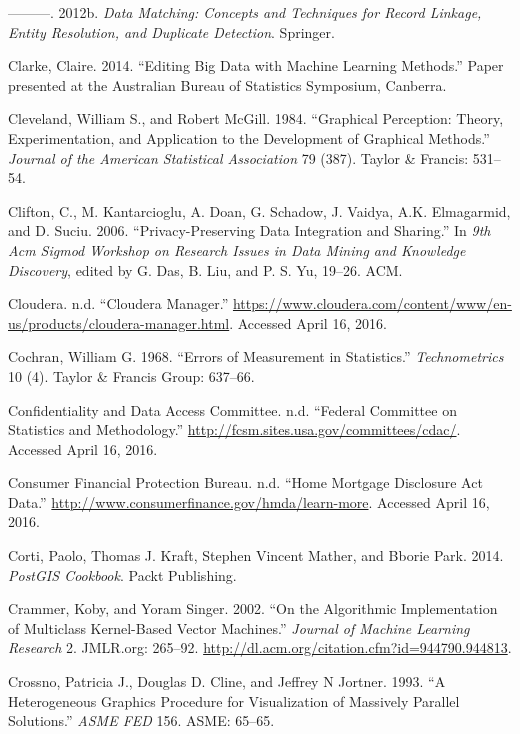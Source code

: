 \documentclass[]{krantz}
\begin{document}
\hypertarget{ref-christen2012data}{}
---------. 2012b. \emph{Data Matching: Concepts and Techniques for
Record Linkage, Entity Resolution, and Duplicate Detection}. Springer.

\hypertarget{ref-Clarke2014}{}
Clarke, Claire. 2014. ``Editing Big Data with Machine Learning
Methods.'' Paper presented at the Australian Bureau of Statistics
Symposium, Canberra.

\hypertarget{ref-cleveland1984graphical}{}
Cleveland, William S., and Robert McGill. 1984. ``Graphical Perception:
Theory, Experimentation, and Application to the Development of Graphical
Methods.'' \emph{Journal of the American Statistical Association} 79
(387). Taylor \& Francis: 531--54.

\hypertarget{ref-Clifton06}{}
Clifton, C., M. Kantarcioglu, A. Doan, G. Schadow, J. Vaidya, A.K.
Elmagarmid, and D. Suciu. 2006. ``Privacy-Preserving Data Integration
and Sharing.'' In \emph{9th Acm Sigmod Workshop on Research Issues in
Data Mining and Knowledge Discovery}, edited by G. Das, B. Liu, and P.
S. Yu, 19--26. ACM.

\hypertarget{ref-ClouderaManager}{}
Cloudera. n.d. ``Cloudera Manager.''
\url{https://www.cloudera.com/content/www/en-us/products/cloudera-manager.html}.
Accessed April 16, 2016.

\hypertarget{ref-cochran1968errors}{}
Cochran, William G. 1968. ``Errors of Measurement in Statistics.''
\emph{Technometrics} 10 (4). Taylor \& Francis Group: 637--66.

\hypertarget{ref-ConfidentialityandDataAccessCommittee}{}
Confidentiality and Data Access Committee. n.d. ``Federal Committee on
Statistics and Methodology.''
\url{http://fcsm.sites.usa.gov/committees/cdac/}. Accessed April 16,
2016.

\hypertarget{ref-HDMA}{}
Consumer Financial Protection Bureau. n.d. ``Home Mortgage Disclosure
Act Data.'' \url{http://www.consumerfinance.gov/hmda/learn-more}.
Accessed April 16, 2016.

\hypertarget{ref-PostGISCookbook}{}
Corti, Paolo, Thomas J. Kraft, Stephen Vincent Mather, and Bborie Park.
2014. \emph{PostGIS Cookbook}. Packt Publishing.

\hypertarget{ref-crammer2002}{}
Crammer, Koby, and Yoram Singer. 2002. ``On the Algorithmic
Implementation of Multiclass Kernel-Based Vector Machines.''
\emph{Journal of Machine Learning Research} 2. JMLR.org: 265--92.
\url{http://dl.acm.org/citation.cfm?id=944790.944813}.

\hypertarget{ref-crossno1993heterogeneous}{}
Crossno, Patricia J., Douglas D. Cline, and Jeffrey N Jortner. 1993. ``A
Heterogeneous Graphics Procedure for Visualization of Massively Parallel
Solutions.'' \emph{ASME FED} 156. ASME: 65--65.
\end{document}
